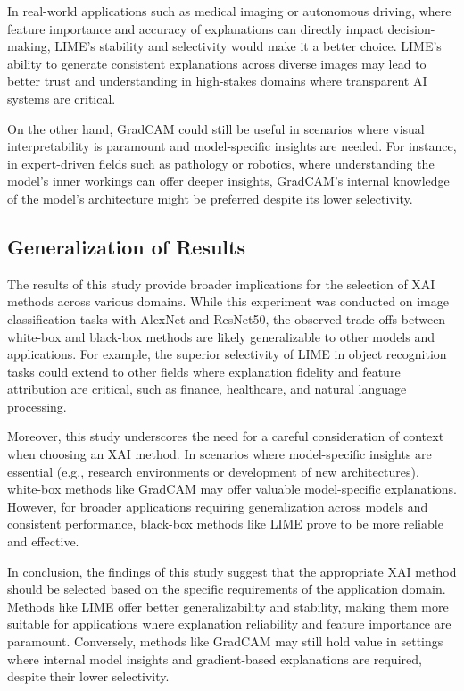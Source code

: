 \documentclass{article}
\begin{document}
In real-world applications such as medical imaging or autonomous driving, where feature importance and accuracy of explanations can directly impact decision-making, LIME’s stability and selectivity would make it a better choice. LIME’s ability to generate consistent explanations across diverse images may lead to better trust and understanding in high-stakes domains where transparent AI systems are critical.

On the other hand, GradCAM could still be useful in scenarios where visual interpretability is paramount and model-specific insights are needed. For instance, in expert-driven fields such as pathology or robotics, where understanding the model’s inner workings can offer deeper insights, GradCAM’s internal knowledge of the model’s architecture might be preferred despite its lower selectivity.


\subsection{Generalization of Results}

The results of this study provide broader implications for the selection of XAI methods across various domains. While this experiment was conducted on image classification tasks with AlexNet and ResNet50, the observed trade-offs between white-box and black-box methods are likely generalizable to other models and applications. For example, the superior selectivity of LIME in object recognition tasks could extend to other fields where explanation fidelity and feature attribution are critical, such as finance, healthcare, and natural language processing.

Moreover, this study underscores the need for a careful consideration of context when choosing an XAI method. In scenarios where model-specific insights are essential (e.g., research environments or development of new architectures), white-box methods like GradCAM may offer valuable model-specific explanations. However, for broader applications requiring generalization across models and consistent performance, black-box methods like LIME prove to be more reliable and effective.

In conclusion, the findings of this study suggest that the appropriate XAI method should be selected based on the specific requirements of the application domain. Methods like LIME offer better generalizability and stability, making them more suitable for applications where explanation reliability and feature importance are paramount. Conversely, methods like GradCAM may still hold value in settings where internal model insights and gradient-based explanations are required, despite their lower selectivity.












\appendix
\end{document}
